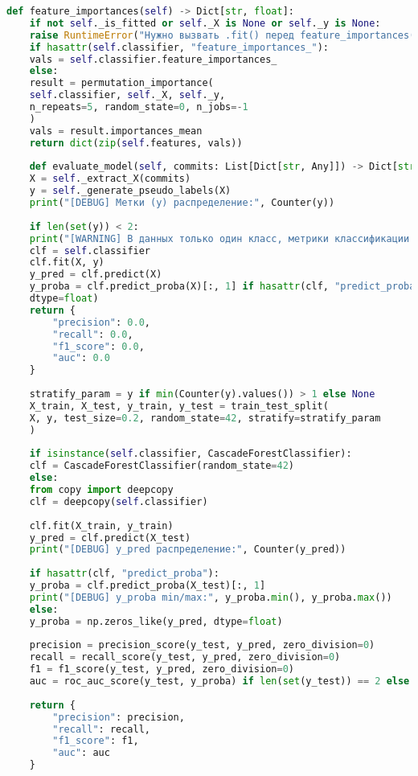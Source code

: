 \begin{lstlisting}[language=Python, caption={{ \texttt{ml\_model.py}}}]
	def feature_importances(self) -> Dict[str, float]:
	if not self._is_fitted or self._X is None or self._y is None:
	raise RuntimeError("Нужно вызвать .fit() перед feature_importances()")
	if hasattr(self.classifier, "feature_importances_"):
	vals = self.classifier.feature_importances_
	else:
	result = permutation_importance(
	self.classifier, self._X, self._y,
	n_repeats=5, random_state=0, n_jobs=-1
	)
	vals = result.importances_mean
	return dict(zip(self.features, vals))
	
	def evaluate_model(self, commits: List[Dict[str, Any]]) -> Dict[str, float]:
	X = self._extract_X(commits)
	y = self._generate_pseudo_labels(X)
	print("[DEBUG] Метки (y) распределение:", Counter(y))
	
	if len(set(y)) < 2:
	print("[WARNING] В данных только один класс, метрики классификации не применимы.")
	clf = self.classifier
	clf.fit(X, y)
	y_pred = clf.predict(X)
	y_proba = clf.predict_proba(X)[:, 1] if hasattr(clf, "predict_proba") else np.zeros_like(y_pred,
	dtype=float)
	return {
		"precision": 0.0,
		"recall": 0.0,
		"f1_score": 0.0,
		"auc": 0.0
	}
	
	stratify_param = y if min(Counter(y).values()) > 1 else None
	X_train, X_test, y_train, y_test = train_test_split(
	X, y, test_size=0.2, random_state=42, stratify=stratify_param
	)
	
	if isinstance(self.classifier, CascadeForestClassifier):
	clf = CascadeForestClassifier(random_state=42)
	else:
	from copy import deepcopy
	clf = deepcopy(self.classifier)
	
	clf.fit(X_train, y_train)
	y_pred = clf.predict(X_test)
	print("[DEBUG] y_pred распределение:", Counter(y_pred))
	
	if hasattr(clf, "predict_proba"):
	y_proba = clf.predict_proba(X_test)[:, 1]
	print("[DEBUG] y_proba min/max:", y_proba.min(), y_proba.max())
	else:
	y_proba = np.zeros_like(y_pred, dtype=float)
	
	precision = precision_score(y_test, y_pred, zero_division=0)
	recall = recall_score(y_test, y_pred, zero_division=0)
	f1 = f1_score(y_test, y_pred, zero_division=0)
	auc = roc_auc_score(y_test, y_proba) if len(set(y_test)) == 2 else 0.0
	
	return {
		"precision": precision,
		"recall": recall,
		"f1_score": f1,
		"auc": auc
	}
\end{lstlisting}

